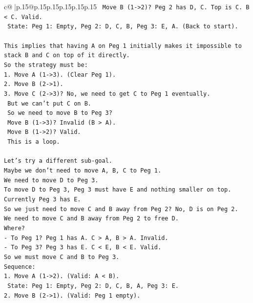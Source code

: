 \documentclass{article}
\begin{document}
{\begin{supertabular}{c@{$\;$}|p{.15\linewidth}@{}p{.15\linewidth}p{.15\linewidth}p{.15\linewidth}p{.15\linewidth}p{.15\linewidth}}
{{{\texttt{  Move B (1{-}>2)? Peg 2 has D, C. Top is C. B < C. Valid.} \\
\texttt{  State: Peg 1: Empty, Peg 2: D, C, B, Peg 3: E, A. (Back to start).} \\
\\ 
\texttt{This implies that having A on Peg 1 initially makes it impossible to stack B and C on top of it directly.} \\
\texttt{So the strategy must be:} \\
\texttt{1. Move A (1{-}>3). (Clear Peg 1).} \\
\texttt{2. Move B (2{-}>1).} \\
\texttt{3. Move C (2{-}>3)? No, we need to get C to Peg 1 eventually.} \\
\texttt{   But we can't put C on B.} \\
\texttt{   So we need to move B to Peg 3?} \\
\texttt{   Move B (1{-}>3)? Invalid (B > A).} \\
\texttt{   Move B (1{-}>2)? Valid.} \\
\texttt{   This is a loop.} \\
\\ 
\texttt{Let's try a different sub{-}goal.} \\
\texttt{Maybe we don't need to move A, B, C to Peg 1.} \\
\texttt{We need to move D to Peg 3.} \\
\texttt{To move D to Peg 3, Peg 3 must have E and nothing smaller on top.} \\
\texttt{Currently Peg 3 has E.} \\
\texttt{So we just need to move C and B away from Peg 2? No, D is on Peg 2.} \\
\texttt{We need to move C and B away from Peg 2 to free D.} \\
\texttt{Where?} \\
\texttt{{-} To Peg 1? Peg 1 has A. C > A, B > A. Invalid.} \\
\texttt{{-} To Peg 3? Peg 3 has E. C < E, B < E. Valid.} \\
\texttt{So we must move C and B to Peg 3.} \\
\texttt{Sequence:} \\
\texttt{1. Move A (1{-}>2). (Valid: A < B).} \\
\texttt{   State: Peg 1: Empty, Peg 2: D, C, B, A, Peg 3: E.} \\
\texttt{2. Move B (2{-}>1). (Valid: Peg 1 empty).} \\
}}}
\end{supertabular}}
\end{document}

